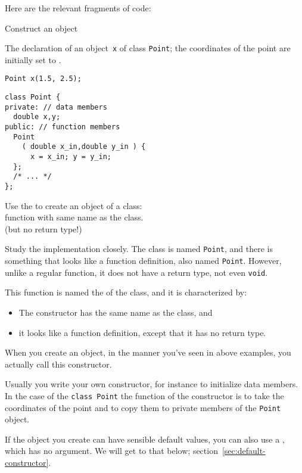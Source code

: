 Here are the relevant fragments of code:
\begin{block}{Construct an object}
  \label{sl:point-construct-use}
\begin{multicols}{2}
  The declaration of an object~\lstinline{x}
  of class \lstinline+Point+;
  the coordinates of the point are initially
  set to .
\begin{lstlisting}
Point x(1.5, 2.5);
\end{lstlisting}
%
\columnbreak
%
  \lstset{style=snippetcode}
\begin{lstlisting}
class Point {
private: // data members
  double x,y;
public: // function members
  Point
    ( double x_in,double y_in ) {
      x = x_in; y = y_in;
  };
  /* ... */
};
\end{lstlisting}
\end{multicols}
\begin{tldr}
  Use the  to create an object of a class:\\
  function with same name as the class.\\
  (but no return type!)
\end{tldr}
\end{block}

Study the implementation closely.
The class is named \lstinline{Point},
and there is something that looks like a function definition,
also named \lstinline{Point}.
However, unlike a regular function, it does not have a return type,
not even \lstinline{void}.

This function is named the  of the class,
and it is characterized by:
\begin{itemize}
\item The constructor has the same name as the class, and
\item it looks like a function definition,
  except that it has no return type.
\end{itemize}
When you create an object,
in the manner you've seen in above examples,
you actually call this constructor.

Usually you write your own constructor,
for instance to initialize data members.
In the case of the \lstinline{class Point}
the function of the constructor is to take the coordinates
of the point and to copy them to private members of the \lstinline{Point} object.

If the object you create can have sensible default values,
you can also use a ,
which has no argument.
We will get to that below; section~\ref{sec:default-constructor}.

